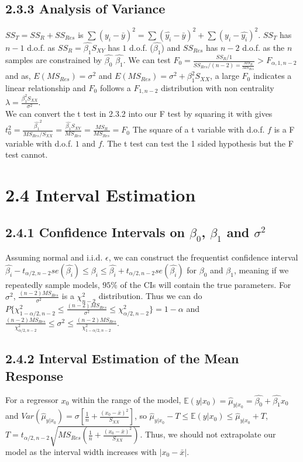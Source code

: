 \begin{multicols*}{3}
\subsection{2.3.3 Analysis of Variance}
$SS_T = SS_R + SS_{Res}$ is $\sum (y_i - \bar{y})^2 = \sum (\hat{y_i} - \bar{y})^2 + \sum (y_i - \hat{y_i})^2$. $SS_T$ has $n - 1$ d.o.f. as $SS_R = \hat{\beta_1}S_{XY}$ has $1$ d.o.f. ($\hat{\beta_1}$) and $SS_{Res}$ has $n - 2$ d.o.f. as the $n$ samples are constrained by $\hat{\beta_0}$ $\hat{\beta_1}$. We can test $F_0 = \frac{SS_R / 1}{SS_{Res} / (n-2) = \frac{MS_R}{MS_{Res}}} > F_{\alpha, 1, n - 2}$ and as, $E(MS_{Res}) = \sigma^2$ and $E(MS_{Res}) = \sigma^2 + \beta_1^2 S_{XX}$, a large $F_0$ indicates a linear relationship and $F_0$ follows a $F_{1, n - 2}$ distribution with non centrality $\lambda = \frac{\beta_1^2 S_{XX}}{\sigma^2}$. \\
We can convert the t test in 2.3.2 into our F test by squaring it with gives $t_0^2 = \frac{\hat{\beta_1}^2}{MS_{Res}/S_{XX}} = \frac{\hat{\beta_1} S_{XY}}{MS_{Res}} = \frac{MS_R}{MS_{Res}} = F_0$ The square of a t variable with d.o.f. $f$ is a F variable with d.o.f. $1$ and $f$. The t test can test the 1 sided hypothesis but the F test cannot.

\section{2.4 Interval Estimation}
\subsection{2.4.1 Confidence Intervals on $\beta_0$, $\beta_1$ and $\sigma^2$}
Assuming normal and i.i.d. $\epsilon$, we can construct the frequentist confidence interval $\hat{\beta_i} - t_{\alpha/2,n-2} se(\hat{\beta_i}) \le \beta_i \le \hat{\beta_i} + t_{\alpha/2,n-2} se(\hat{\beta_i})$ for $\beta_0$ and $\beta_1$, meaning if we repeatedly sample models, $95\%$ of the CIs will contain the true parameters. For $\sigma^2$, $\frac{(n - 2)MS_{Res}}{\sigma^2}$ is a $\chi^2_{n-2}$ distribution. Thus we can do $P\{\chi^2_{1-\alpha/2,n-2} \le \frac{(n - 2)MS_{Res}}{\sigma^2} \le \chi^2_{\alpha/2,n-2}\} = 1 - \alpha$ and $\frac{(n - 2)MS_{Res}}{\chi^2_{\alpha/2,n-2}} \le \sigma^2 \le \frac{(n - 2)MS_{Res}}{\chi^2_{1-\alpha/2,n-2}}$.

\subsection{2.4.2 Interval Estimation of the Mean Response}
For a regressor $x_0$ within the range of the model, $\mathbb{E}(y|x_0) = \hat{\mu}_{y|x_0} = \hat{\beta_0} + \hat{\beta_1}x_0$ and $Var(\hat{\mu}_{y|x_0}) = \sigma[\frac{1}{n} + \frac{(x_0 - \bar{x})^2}{S_{XX}}]$, so $\hat{\mu}_{y|x_0} - T \le \mathbb{E}(y|x_0) \le \hat{\mu}_{y|x_0} + T$, $T = t_{\alpha/2,n-2}\sqrt{MS_{Res}(\frac{1}{n} + \frac{(x_0 - \bar{x})^2}{S_{XX}})}$. Thus, we should not extrapolate our model as the interval width increases with $|x_0 - \bar{x}|$.


\end{multicols*}
